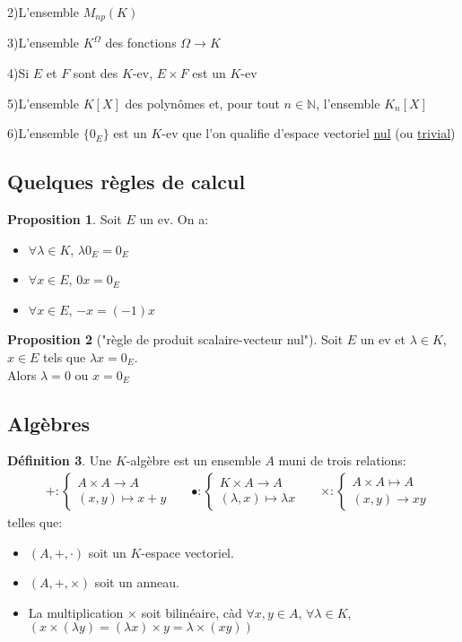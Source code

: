 \documentclass[10pt,a4paper]{article}
\theoremstyle{definition}
\newtheorem{proposition}{Proposition}[section]
\newtheorem{definition}[proposition]{Définition}
\begin{document}
2)L'ensemble $M_{np}(K)$

3)L'ensemble $K^\Omega$ des fonctions $\Omega \to K$

4)Si $E$ et $F$ sont des $K$-ev, $E \times F$ est un $K$-ev

5)L'ensemble $K[X]$ des polynômes et, pour tout $n \in \mathbb{N}$, l'ensemble $K_n[X]$

6)L'ensemble $\{0_E\}$ est un $K$-ev que l'on qualifie d'espace vectoriel \uline{nul} (ou \uline{trivial})

\subsection{Quelques règles de calcul}
\begin{proposition}
Soit $E$ un ev.
On a:
\begin{itemize}
\item $\forall \lambda \in K$, $\lambda 0_E = 0_E$
\item $\forall x \in E$, $0x = 0_E$
\item $\forall x \in E$, $-x = (-1)x$
\end{itemize}
\end{proposition}
\begin{proposition}["règle de produit scalaire-vecteur nul"]
Soit $E$ un ev et $\lambda \in K$, $x \in E$ tels que $\lambda x = 0_E$. \\
Alors $\lambda = 0$ ou $x = 0_E$
\end{proposition}

\pagebreak

\subsection{Algèbres}
\begin{definition}
Une $K$-algèbre est un ensemble $A$ muni de trois relations:
\begin{align*}
&+: \begin{cases}
A \times A \to A \\
(x, y) \mapsto x + y
\end{cases}
&
&\bullet: \begin{cases}
K \times A \to A \\
(\lambda, x) \mapsto \lambda x
\end{cases}
&
&\times: \begin{cases}
A \times A \mapsto A \\
(x, y) \to xy
\end{cases}
\end{align*}
telles que:
\begin{itemize}
\item $(A, +, \cdot)$ soit un $K$-espace vectoriel.
\item $(A, +, \times)$ soit un anneau.
\item La multiplication $\times$ soit bilinéaire, càd $\forall x, y \in A$, $\forall \lambda \in K$, $(x \times (\lambda y) = (\lambda x) \times y = \lambda \times (x y))$
\end{itemize}
\end{definition}
\end{document}
